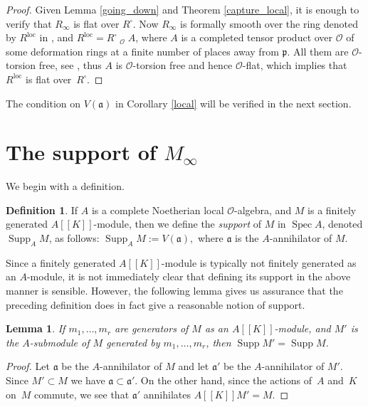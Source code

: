 \documentclass[JEP,XML,SOM,Unicode,NoEqCountersInSection]{cedram}
\let\mathcal\mathscr
\newcommand{\ssquare}{{\scriptscriptstyle\square}}
\newtheorem{lem}[prop]{Lemma}
\theoremstyle{definition}
\newtheorem{defi}[prop]{Definition}
\DeclareMathOperator{\Spec}{Spec}
\DeclareMathOperator{\supp}{Supp}
\DeclareMathOperator{\wtimes}{\widehat{\otimes}}
\newcommand{\br}[1]{[\![#1]\!]}
\newcommand{\cO}{\mathcal{O}}
\newcommand{\pp}{\mathfrak p}
\newcommand{\loc}{\mathrm{loc}}
\begin{document}
\begin{proof} Given Lemma \ref{going_down} and Theorem \ref{capture_local}, it is enough to verify that $R_{\infty}$ is flat over $R^\ssquare$. Now
$R_{\infty}$ is formally smooth over the ring denoted by $R^{\loc}$ in \cite[\S 2.6]{six-authors}, and $R^{\loc}= R^\ssquare \wtimes_{\cO} A$, where
$A$ is a completed tensor product over $\cO$ of some deformation rings at a finite number of places away from $\pp$. All them are $\cO$-torsion free, see
\hbox{\cite[\S 2.4]{six-authors}}, thus $A$ is $\cO$-torsion free and hence $\cO$-flat, which implies that $R^{\loc}$ is flat over~$R^\ssquare$.
\end{proof}

The condition on $V(\mathfrak a)$ in Corollary \ref{local} will be verified in the next section.

\section{The support of \texorpdfstring{$M_{\infty}$}{Minf}}\label{support}
We begin with a definition.

\begin{defi}\label{define_support} If $A$ is a complete Noetherian
local $\cO$-algebra,
and $M$ is a finitely generated $A\br{K}$-module,
then we define the {\em support} of $M$ in $\Spec A$, denoted
$\supp_A M$, as follows:
$\supp_A M:= V(\mathfrak a),$
where $\mathfrak a$ is the $A$-annihilator of $M$.
\end{defi}

Since a finitely generated $A\br{K}$-module is typically not finitely generated
as an $A$\nobreakdash-module, it is not immediately clear that defining its support
in the above manner is sensible. However, the following lemma gives
us assurance that the preceding definition does in fact give a reasonable
notion of support.

\begin{lem}\label{all_finite} If $m_1, \ldots, m_r$ are generators of $M$
as an $A\br{K}$-module, and $M'$ is the $A$-submodule
of $M$ generated by $m_1, \ldots, m_r$,
then $\supp M'=\supp M$.
\end{lem}

\begin{proof} Let $\mathfrak a$ be the $A$-annihilator of $M$ and let $\mathfrak a'$ be the $A$-annihilator of $M'$. Since $M'\subset M$
we have $\mathfrak a\subset \mathfrak a'$.
On the other hand, since the actions of~$A$ and~$K$ on~$M$ commute,
we see that $\mathfrak a'$ annihilates $A\br{K}M' = M.$
\end{proof}
\end{document}
